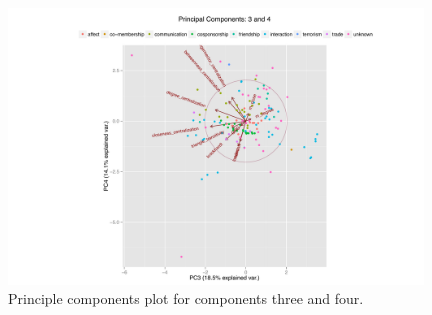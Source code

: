 \documentclass[3p,times]{elsarticle}
\begin{document}
\begin{figure}
\begin{center}
	\caption{\label{fig:3 and 4} Principle components plot for components three and four.}
		\includegraphics[width = 0.98\textwidth]{./images/Observed_PCA_Components3_4.pdf}
\end{center}
\end{figure}


%
%
\end{document}
